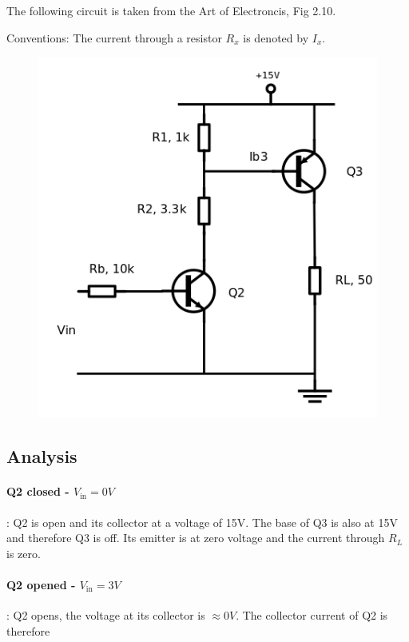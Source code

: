 
The following circuit is taken from the Art of Electroncis, Fig 2.10.

Conventions: The current through a resistor $R_x$ is denoted by $I_x$.

\begin{figure}[htb]
\includegraphics[scale=0.5]{images/switch_2_bjt.png}
\end{figure}

\subsection{Analysis}

\paragraph{Q2 closed - $V_\text{in} = 0V$}: Q2 is open and its collector at a voltage of 15V. The base of Q3 is also at 15V and therefore Q3 is off. Its emitter is at zero voltage and the current through $R_L$ is zero.

\paragraph{Q2 opened - $V_\text{in} = 3V$}: Q2 opens, the voltage at its collector is $\approx 0V$. The collector current of Q2 is therefore

